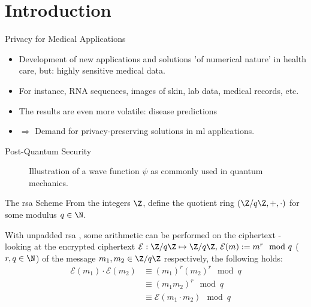 \section{Introduction}
\begin{frame}{Privacy for Medical Applications}
  \begin{itemize}
    \item Development of new applications and solutions 'of numerical nature' in health care, but: highly sensitive medical data.
    \item For instance, RNA sequences, images of skin, lab data, medical records, etc.
    \item The results are even more volatile: disease predictions
    \item $\Rightarrow$ Demand for privacy-preserving solutions in \gls{ml} applications.
  \end{itemize}
\end{frame}

\begin{frame}{Post-Quantum Security}
  \begin{figure}[H]
    \centering
    \caption{Illustration of a wave function $\psi$ as commonly used in quantum mechanics.}
    \label{fig:wave-function}
  \end{figure}
\end{frame}

\begin{frame}{The \gls{rsa} Scheme}
  From the integers $\Z$, define the quotient ring $(\Z/q\Z, +, \cdot)$ for some modulus $q \in \N$.

  With unpadded \gls{rsa} \parencite{1983-rsa}, some arithmetic can be performed on the ciphertext - looking at the encrypted ciphertext $\mathcal{E}: \Z/q\Z \mapsto \Z/q\Z,\, \mathcal{E}(m) := m^r \mod q$ ($r, q \in \N$) of the message $m_1, m_2 \in \Z/q\Z$ respectively, the following holds:
  \begin{align*}
    \mathcal{E}(m_1) \cdot \mathcal{E}(m_2)
     & \equiv (m_1)^r (m_2)^r \mod q            \\
     & \equiv (m_1 m_2)^r \mod q                \\
     & \equiv \mathcal{E}(m_1 \cdot m_2) \mod q
  \end{align*}
\end{frame}
